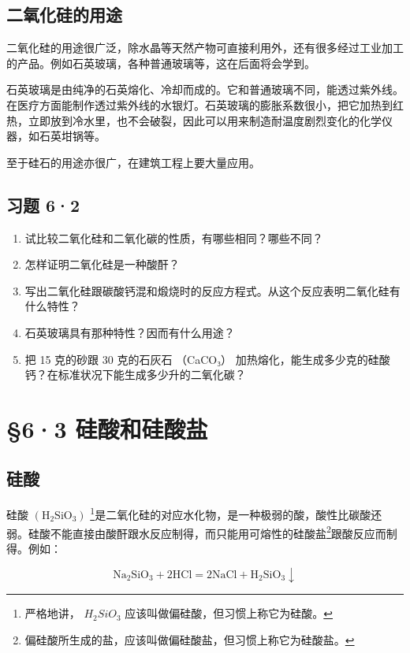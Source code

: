 \subsection{二氧化硅的用途}

二氧化硅的用途很广泛，除水晶等天然产物可直接利用外，还有很多经过工业加工的产品。例如石英玻璃，各种普通玻璃等，这在后面将会学到。

石英玻璃是由纯净的石英熔化、冷却而成的。它和普通玻璃不同，能透过紫外线。在医疗方面能制作透过紫外线的水银灯。石英玻璃的膨胀系数很小，把它加热到红热，立即放到冷水里，也不会破裂，因此可以用来制造耐温度剧烈变化的化学仪器，如石英坩锅等。

至于硅石的用途亦很广，在建筑工程上要大量应用。

\subsection{习题 6·2}

\begin{enumerate}
\item
  试比较二氧化硅和二氧化碳的性质，有哪些相同？哪些不同？
\item
  怎样证明二氧化硅是一种酸酐？
\item
  写出二氧化硅跟碳酸钙混和煅烧时的反应方程式。从这个反应表明二氧化硅有什么特性？
\item
  石英玻璃具有那种特性？因而有什么用途？
\item
  把 15 克的砂跟 30 克的石灰石 （CaCO₃）
  加热熔化，能生成多少克的硅酸钙？在标准状况下能生成多少升的二氧化碳？
\end{enumerate}

\section{§6·3 硅酸和硅酸盐}

\subsection{硅酸}

硅酸 \(\left(\mathrm{H}_{2}\mathrm{SiO}_{3}\right)\)
\footnote{严格地讲， \(H_{2}SiO_{3}\)
  应该叫做偏硅酸，但习惯上称它为硅酸。}是二氧化硅的对应水化物，是一种极弱的酸，酸性比碳酸还弱。硅酸不能直接由酸酐跟水反应制得，而只能用可熔性的硅酸盐\footnote{偏硅酸所生成的盐，应该叫做偏硅酸盐，但习惯上称它为硅酸盐。}跟酸反应而制得。例如：

\[
\mathrm{Na} _ {2} \mathrm{SiO} _ {3} + 2 \mathrm{HCl} = 2 \mathrm{NaCl} + \mathrm{H} _ {2} \mathrm{SiO} _ {3} \downarrow
\]

